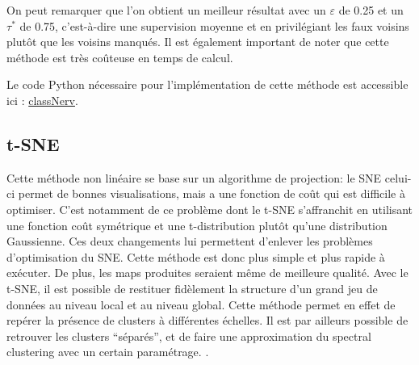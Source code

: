 On peut remarquer que l'on obtient un meilleur résultat avec un $\varepsilon$ de 0.25 et un $\tau^*$ de 0.75, c'est-à-dire une supervision moyenne et en privilégiant les faux voisins plutôt que les voisins manqués.
Il est également important de noter que cette méthode est très coûteuse en temps de calcul. 

Le code Python nécessaire pour l'implémentation de cette méthode est accessible ici : \href{https://zenodo.org/record/4094851#.YaxeoS_pO-w}{classNerv}.




\subsection{t-SNE}

Cette méthode non linéaire se base sur un algorithme de projection: le SNE \cite{hinton2002-SNE} celui-ci permet de bonnes visualisations, mais a une fonction de coût qui est difficile à optimiser. C’est notamment de ce problème dont le t-SNE s’affranchit en utilisant une fonction coût symétrique  et une t-distribution plutôt qu’une distribution Gaussienne. 
Ces deux changements lui  permettent d’enlever les problèmes d’optimisation du SNE. Cette méthode est donc plus simple et plus rapide à exécuter. De plus, les maps produites seraient même de meilleure qualité\cite{van2008TSNE}.
\smallskip
Avec le t-SNE, il est possible de restituer fidèlement la structure d’un grand jeu de données au niveau local et au niveau global. Cette méthode permet en effet de repérer la présence de clusters à différentes échelles. Il est par ailleurs possible de retrouver les clusters “séparés”, et de faire une approximation du spectral clustering avec un certain paramétrage. \cite{linderman2019Spectral1} \cite{chui2006Spectral2} \cite{von2007SpectralClustering}.
\smallskip

